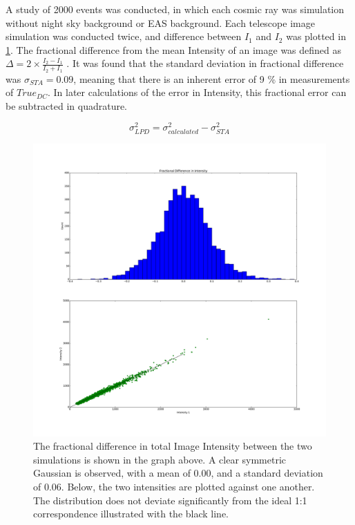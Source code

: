\documentclass{article}
\begin{document}
A study of 2000 events was conducted, in which each cosmic ray was simulation without night sky background or EAS background. Each telescope image simulation was conducted twice, and difference between $I_{1}$ and $I_{2}$ was plotted in \ref{fig:simtelerror}. The fractional difference from the mean Intensity of an image was defined as $\Delta = 2 \times \frac{I_{2} - I_{1}}{{I_{2} + I_{1}}}$ . It was found that the standard deviation in fractional difference was $\sigma_{STA}=0.09$, meaning that there is an inherent error of 9 \% in measurements of $True_{DC}$. In later calculations of the error in Intensity, this fractional error can be subtracted in quadrature. 

\[ \sigma_{LPD}^{2} = \sigma_{calculated}^{2} - \sigma_{STA}^{2}  \]

\begin{figure}
\begin{center}
\includegraphics[width=\textwidth]{simtelerror1}
\caption{The fractional difference in total Image Intensity between the two simulations is shown in the graph above. A clear symmetric Gaussian is observed, with a mean of 0.00, and a standard deviation of 0.06. Below, the two intensities are plotted against one another. The distribution does not deviate significantly from the ideal 1:1 correspondence illustrated with the black line.}
\label{fig:simtelerror}
\end{center}
\end{figure} 
\end{document}

